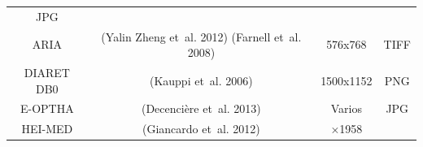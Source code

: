 \documentclass[
  12pt,
  spanish,
  a4paperpaper,
]{report}
\begin{document}
\begin{longtable}[]{@{}cccc@{}}
\begin{minipage}[t]{0.09\columnwidth}
JPG\strut
\end{minipage}\tabularnewline
\begin{minipage}[t]{0.33\columnwidth}\centering
ARIA\strut
\end{minipage} & \begin{minipage}[t]{0.33\columnwidth}\centering
(Yalin Zheng et~al. 2012) (Farnell et~al. 2008)\strut
\end{minipage} & \begin{minipage}[t]{0.13\columnwidth}\centering
576x768\strut
\end{minipage} & \begin{minipage}[t]{0.09\columnwidth}\centering
TIFF\strut
\end{minipage}\tabularnewline
\begin{minipage}[t]{0.33\columnwidth}\centering
DIARET DB0\strut
\end{minipage} & \begin{minipage}[t]{0.33\columnwidth}\centering
(Kauppi et~al. 2006)\strut
\end{minipage} & \begin{minipage}[t]{0.13\columnwidth}\centering
1500x1152\strut
\end{minipage} & \begin{minipage}[t]{0.09\columnwidth}\centering
PNG\strut
\end{minipage}\tabularnewline
\begin{minipage}[t]{0.33\columnwidth}\centering
E-OPTHA\strut
\end{minipage} & \begin{minipage}[t]{0.33\columnwidth}\centering
(Decencière et~al. 2013)\strut
\end{minipage} & \begin{minipage}[t]{0.13\columnwidth}\centering
Varios\strut
\end{minipage} & \begin{minipage}[t]{0.09\columnwidth}\centering
JPG\strut
\end{minipage}\tabularnewline
\begin{minipage}[t]{0.33\columnwidth}\centering
HEI-MED\strut
\end{minipage} & \begin{minipage}[t]{0.33\columnwidth}\centering
(Giancardo et~al. 2012)\strut
\end{minipage} & \begin{minipage}[t]{0.13\columnwidth}\centering
2196×1958\strut
\end{minipage} & \begin{minipage}[t]{0.09\columnwidth}\centering

\end{minipage}
\end{longtable}
\end{document}
